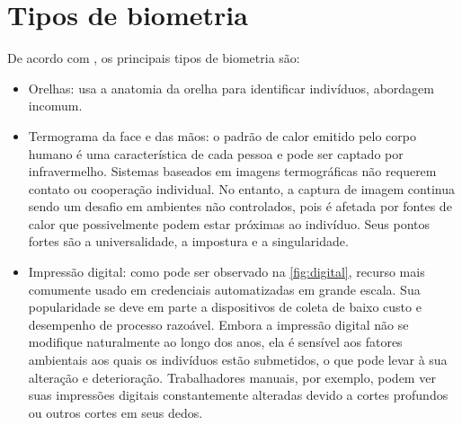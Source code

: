 \section{Tipos de biometria}\label{sec:tiposBiometria}

De acordo com , os principais tipos de biometria são:

\begin{itemize}
    \item Orelhas: usa a anatomia da orelha para identificar indivíduos, abordagem 
    incomum. 

    \item Termograma da face e das mãos: o padrão de calor emitido pelo corpo 
    humano é uma característica de cada pessoa e pode ser captado por 
    infravermelho. Sistemas baseados em imagens termográficas não requerem 
    contato ou cooperação individual. No entanto, a captura de imagem continua 
    sendo um desafio em ambientes não controlados, pois é afetada por fontes de 
    calor que possivelmente podem estar próximas ao indivíduo. Seus pontos fortes 
    são a universalidade, a impostura e a singularidade.

    \item Impressão digital: como pode ser observado na \autoref{fig:digital}, 
    recurso mais comumente usado em credenciais 
     automatizadas em grande escala.  Sua popularidade se deve em parte a 
     dispositivos de coleta de baixo custo e desempenho de processo razoável. 
     Embora a impressão digital não se modifique naturalmente ao longo dos anos, 
     ela é sensível aos fatores ambientais aos quais os indivíduos estão 
     submetidos, o que pode levar à sua alteração e deterioração. Trabalhadores 
     manuais, por exemplo, podem ver suas impressões digitais constantemente 
     alteradas devido a cortes profundos ou outros cortes em seus dedos.
     

\end{itemize}
